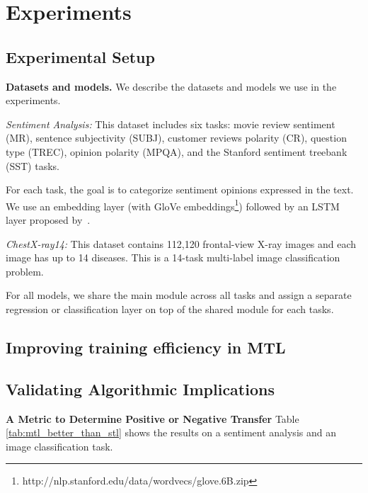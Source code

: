 \section{Experiments}

\subsection{Experimental Setup}

{\bf Datasets and models.} We describe the datasets and models we use in the experiments.

{\it Sentiment Analysis:} This dataset includes six tasks: movie review sentiment (MR), sentence subjectivity (SUBJ), customer reviews polarity (CR), question type (TREC), opinion polarity (MPQA), and the Stanford sentiment treebank (SST) tasks.

{For each task, the goal is to categorize sentiment opinions expressed in the text.
We use an embedding layer (with GloVe embeddings\footnote{http://nlp.stanford.edu/data/wordvecs/glove.6B.zip}) followed by an LSTM layer proposed by~\cite{lei2018simple}.
}

{\it ChestX-ray14:} This dataset contains 112,120 frontal-view X-ray images and each image has up to 14 diseases.
This is a 14-task multi-label image classification problem.

For all models, we share the main module across all tasks and assign a separate regression or classification layer on top of the shared module for each tasks.

\subsection{Improving training efficiency in MTL}

\subsection{Validating Algorithmic Implications}

\textbf{A Metric to Determine Positive or Negative Transfer}
Table \ref{tab:mtl_better_than_stl} shows the results on a sentiment analysis and an image classification task.

